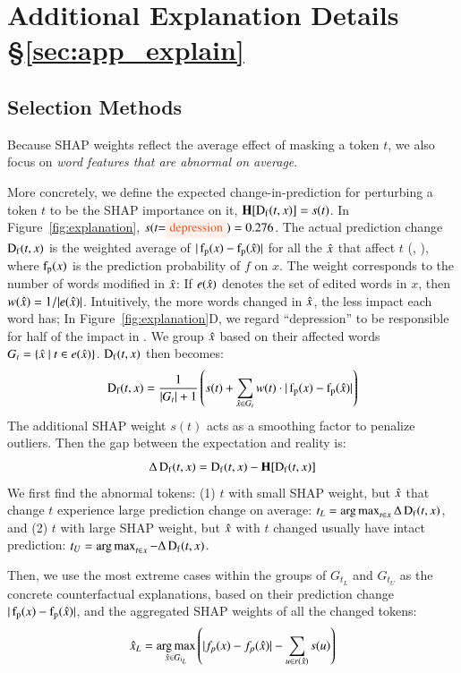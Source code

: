\section{Additional Explanation Details \S\ref{sec:app_explain}}
\label{appendix:explanation}


\subsection{Selection Methods}
\label{appendix:exp_rank}

Because  SHAP weights reflect the average effect of masking a token $t$, we also focus on \emph{word features that are abnormal on average}.

More concretely, we define the expected change-in-prediction for perturbing a token $t$ to be the SHAP importance on it, $\operatorname*{\mathbf{H}}[\operatorname*{D_f}(t, x)] = s(t)$.
In Figure~\ref{fig:explanation}, $s(t\text{=\remove{depression}})=0.276$.
The actual prediction change $\operatorname*{D_f}(t, x)$ is the weighted average of $|\operatorname*{f_p}(x)-\operatorname*{f_p}(\hat{x})|$ for all the $\hat{x}$ that affect $t$ (, ), where $\operatorname*{f_p}(x)$ is the prediction probability of $f$ on $x$.
The weight corresponds to the number of words modified in $\hat{x}$: If $e(\hat{x})$ denotes the set of edited words in $x$, then $w(\hat{x}) = 1/|e(\hat{x})|$.
Intuitively, the more words changed in $\hat{x}$, the less impact each word has; In Figure~\ref{fig:explanation}D, we regard ``depression'' to be responsible for half of the impact in .
We group $\hat{x}$ based on their affected words $G_t = \{\hat{x}\ |\ t \in e(\hat{x})\}$. $\operatorname*{D_f}(t, x)$ then becomes:
$$\operatorname*{D_f}(t, x) = \frac{1}{|G_t|+1} \left(s(t) + \sum_{\hat{x} \in G_t} w(t)\cdot |\operatorname*{f_p}(x)-\operatorname*{f_p}(\hat{x})|\right)$$
The additional SHAP weight $s(t)$ acts as a smoothing factor to penalize outliers.
Then the gap between the expectation and reality is:
$$\Delta\operatorname*{D_f}(t, x) = \operatorname*{D_f}(t, x)-\operatorname*{\mathbf{H}}[\operatorname*{D_f}(t, x)]$$
We first find the abnormal tokens: (1) $t$ with small SHAP weight, but $\hat{x}$ that change $t$ experience large prediction change on average: $t_L = \operatorname*{arg\,max}_{t\in x} \Delta\operatorname*{D_f}(t, x)$, and (2) $t$ with large SHAP weight, but $\hat{x}$ with $t$ changed usually have intact prediction: $t_U = \operatorname*{arg\,max}_{t\in x} -\Delta\operatorname*{D_f}(t, x)$.

Then, we use the most extreme cases within the groups of $G_{t_L}$ and $G_{t_U}$ as the concrete counterfactual explanations, based on their prediction change $|\operatorname*{f_p}(x)-\operatorname*{f_p}(\hat{x})|$, and the aggregated SHAP weights of all the changed tokens:
$$\hat{x}_L = \operatorname*{arg\,max}_{\hat{x} \in G_{t_L}} \left( |f_p(x)-f_p(\hat{x})| - \sum_{u\in r(\hat{x})} s(u) \right)$$ 


